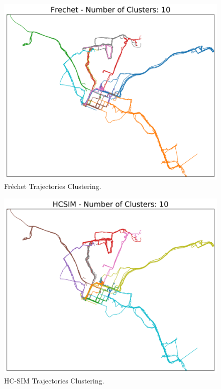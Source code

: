 \documentclass[a4paper, 12pt]{article}
\begin{document}
\begin{figure}[htbp!]
    \centering
    \includegraphics[width=1\textwidth]{frechet_trajectory_clustering.png}
    \caption{Fréchet Trajectories Clustering.}
    \label{fig23}
\end{figure}

\begin{figure}[htbp!]
    \centering
    \includegraphics[width=1\textwidth]{hcsim_trajectory_clustering.png}
    \caption{HC-SIM Trajectories Clustering.}
    \label{fig24}
\end{figure}
\end{document}
